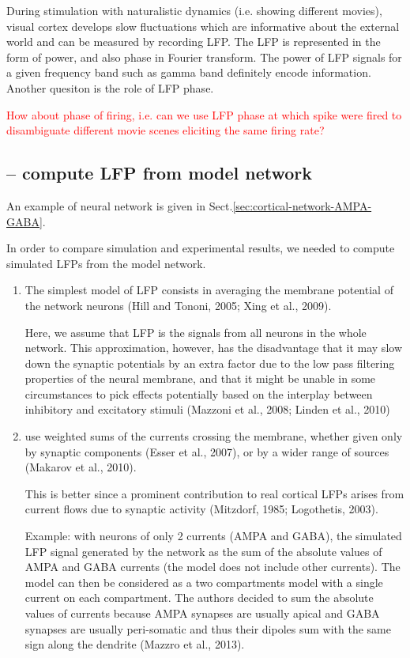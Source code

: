 During stimulation with naturalistic dynamics (i.e. showing different
movies), visual cortex develops slow fluctuations which are informative about
the external world and can be measured by recording LFP. The LFP is represented
in the form of power, and also phase in Fourier transform. The power of LFP
signals for a given frequency band such as gamma band definitely encode
information. Another quesiton is the role of LFP phase.
 
\textcolor{red}{How about phase of firing, i.e. can we use LFP phase at which
spike were fired to disambiguate different movie scenes eliciting the same
firing rate?}


\subsection{-- compute LFP from model network}

An example of neural network is given in
Sect.\ref{sec:cortical-network-AMPA-GABA}.

In order to compare simulation and experimental results, we needed to compute
simulated LFPs from the model network. 
\begin{enumerate}
  \item  The simplest model of LFP consists in averaging the membrane potential of the
network neurons (Hill and Tononi, 2005; Xing et al., 2009). 

Here, we assume that LFP is the signals from all neurons in the whole network.
This approximation, however, has the
disadvantage that it may slow down the synaptic potentials by an extra factor due to the low pass
filtering properties of the neural membrane, and that it might be unable in some circumstances to pick
effects potentially based on the interplay between inhibitory and excitatory
stimuli (Mazzoni et al.,
2008; Linden et al., 2010)


 \item use weighted sums of the currents crossing the membrane, whether given
 only by synaptic components (Esser et al., 2007), or by a wider range of
 sources (Makarov et al., 2010).

This is better since a prominent contribution to real cortical LFPs arises from
current flows due to synaptic activity (Mitzdorf, 1985; Logothetis, 2003).

Example: with neurons of only 2 currents (AMPA and GABA), the simulated LFP
signal generated by the network as the sum of the absolute values of AMPA and
GABA currents (the model does not include other currents). 
The model can then be considered as a two compartments model with a single
current on each compartment. The authors decided
to sum the absolute values of currents because AMPA synapses are usually apical
and GABA synapses are usually peri-somatic and thus their dipoles sum with the
same sign along the dendrite (Mazzro et al., 2013).

\end{enumerate}

